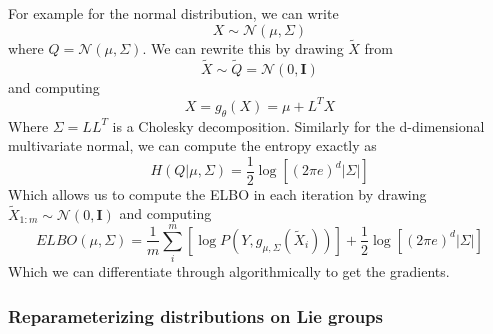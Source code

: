 For example for the normal distribution, we can write
\begin{equation}
X \sim \mathcal{N}(\mu, \Sigma)
\end{equation}
where $Q = \mathcal{N}(\mu, \Sigma)$. We can rewrite this by drawing $\tilde{X}$ from
\begin{equation}
\tilde{X} \sim \tilde{Q} = \mathcal{N}(0, \mathbf{I})
\end{equation}
and computing
\begin{equation}
X = g_\theta(X) = \mu + L^T X
\end{equation}
Where $\Sigma = L L^T$ is a Cholesky decomposition.
Similarly for the d-dimensional multivariate normal, we can compute the entropy exactly as
\begin{equation}
H(Q | \mu, \Sigma) = \dfrac{1}{2} \log{\left [ (2 \pi e)^d |\Sigma| \right ]}
\end{equation}
Which allows us to compute the ELBO in each iteration by drawing $\tilde{X}_{1:m} \sim \mathcal{N}(0, \mathbf{I})$ and computing
\begin{equation}
ELBO(\mu, \Sigma) = \dfrac{1}{m} \sum_i^m{ \left [ \log{P \left ( Y, g_{\mu, \Sigma}(\tilde{X}_i) \right ) } \right ] } + \dfrac{1}{2} \log{\left [ (2 \pi e)^d |\Sigma| \right ]} 
\end{equation}
Which we can differentiate through algorithmically to get the gradients.

\subsubsection{Reparameterizing distributions on Lie groups}